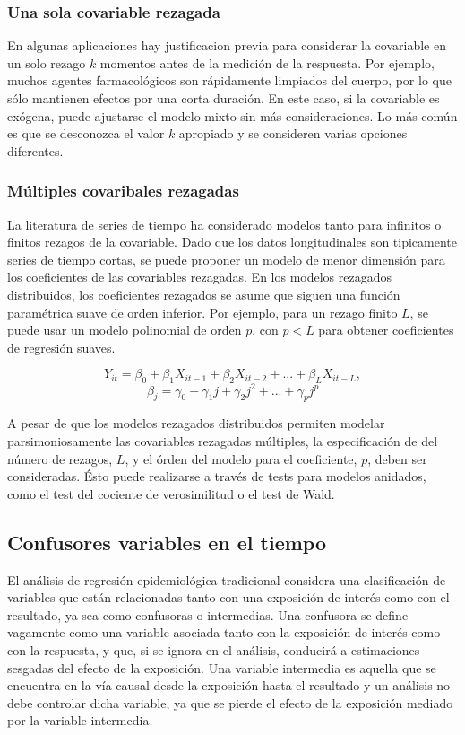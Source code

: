 \documentclass[spanish]{article}
\numberwithin{figure}{subsection}
\numberwithin{equation}{subsection}
\numberwithin{table}{subsection}
\begin{document}
\subsubsection{Una sola covariable rezagada}

En algunas aplicaciones hay justificacion previa para considerar la covariable en un solo rezago $k$ momentos antes de la
medición de la respuesta. Por ejemplo, muchos agentes farmacológicos son rápidamente limpiados del cuerpo, por lo que sólo
mantienen efectos por una corta duración. En este caso, si la covariable es exógena, puede ajustarse el modelo mixto sin más
consideraciones. Lo más común es que se desconozca el valor $k$ apropiado y se consideren varias opciones diferentes.

\subsubsection{Múltiples covaribales rezagadas}

La literatura de series de tiempo ha considerado modelos tanto para infinitos o finitos rezagos de la covariable. Dado que
los datos longitudinales son tipicamente series de tiempo cortas, se puede proponer un modelo de menor dimensión para los
coeficientes de las covariables rezagadas. En los modelos rezagados distribuidos, los coeficientes rezagados se asume
que siguen una función paramétrica suave de orden inferior. Por ejemplo, para un rezago finito $L$, se puede usar un
modelo polinomial de orden $p$, con $p < L$ para obtener coeficientes de regresión suaves.

\[ Y_{it} = \beta_0 + \beta_1 X_{it-1} + \beta_2 X_{it-2} + ... + \beta_L X_{it-L}, \]
\[ \beta_j = \gamma_0 + \gamma_1 j + \gamma_2 j^2 + ... + \gamma_p j^p \]

A pesar de que los modelos rezagados distribuidos permiten modelar parsimoniosamente las covariables rezagadas múltiples,
la especificación de del número de rezagos, $L$, y el órden del modelo para el coeficiente, $p$, deben ser consideradas.
Ésto puede realizarse a través de tests para modelos anidados, como el test del cociente de verosimilitud o el test de Wald.

\subsection{Confusores variables en el tiempo}

El análisis de regresión epidemiológica tradicional considera una clasificación de variables que están relacionadas tanto
con una exposición de interés como con el resultado, ya sea como confusoras o intermedias. Una confusora se define
vagamente como una variable asociada tanto con la exposición de interés como con la respuesta, y que, si se ignora en
el análisis, conducirá a estimaciones sesgadas del efecto de la exposición. Una variable intermedia es aquella que se
encuentra en la vía causal desde la exposición hasta el resultado y un análisis no debe controlar
dicha variable, ya que se pierde el efecto de la exposición mediado por la variable intermedia.
\end{document}
